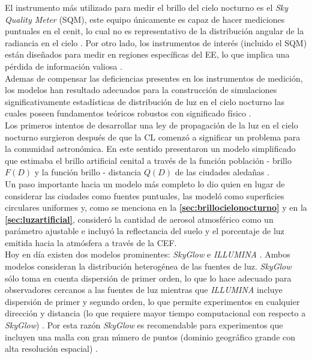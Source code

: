 El instrumento más utilizado para medir el brillo del cielo nocturno es el \textit{Sky Quality Meter} (SQM), este equipo únicamente es capaz de hacer mediciones puntuales en el cenit, lo cual no es representativo de la distribución angular de la radiancia en el cielo \citep{Ribas2015}. Por otro lado, los instrumentos de interés (incluido el SQM) están diseñados para medir en regiones específicas del EE, lo que implica una pérdida de información valiosa \citep{Ribas2015}.\\

Ademas de compensar las deficiencias presentes en los instrumentos de medición, los modelos han resultado adecuados para la construcción de simulaciones significativamente estadísticas de distribución de luz en el cielo nocturno las cuales poseen fundamentos teóricos robustos con significado físico \citep{Solano2015}.\\

Los primeros intentos de desarrollar una ley de propagación de la luz en el cielo nocturno surgieron después de que la CL comenzó a significar un problema para la comunidad astronómica. En este sentido \cite{Bertiau1973} presentaron un modelo simplificado que estimaba el brillo artificial cenital a través de la función población - brillo $F (D)$ y la función brillo - distancia $Q (D)$ de las ciudades aledañas \citep{Linares2018}.\\

Un paso importante hacia un modelo más completo lo dio \cite{Garstang1986} quien en lugar de considerar las ciudades como fuentes puntuales, las modeló como superficies circulares uniformes \citep{Linares2018} y, como se menciona en la \textbf{\autoref{sec:brillocielonocturno}} y en la \textbf{\autoref{sec:luzartificial}}, consideró la cantidad de aerosol atmosférico como un parámetro ajustable e incluyó la reflectancia del suelo y el porcentaje de luz emitida hacia la atmósfera a través de la CEF.\\

Hoy en día existen dos modelos prominentes: \textit{SkyGlow} \citep{Kocifaj2007} e \textit{ILLUMINA} \citep{Aube2005}. Ambos modelos consideran la distribución heterogénea de las fuentes de luz. \textit{SkyGlow} sólo toma en cuenta dispersión de primer orden, lo que lo hace adecuado para observadores cercanos a las fuentes de luz mientras que \textit{ILLUMINA} incluye dispersión de primer y segundo orden, lo que permite experimentos en cualquier dirección y distancia (lo que requiere mayor tiempo computacional con respecto a \textit{SkyGlow}) \citep{Linares2018}. Por esta razón \textit{SkyGlow} es recomendable para experimentos que incluyen una malla con gran número de puntos (dominio geográfico grande con alta resolución espacial) \citep{Linares2018}.\\

